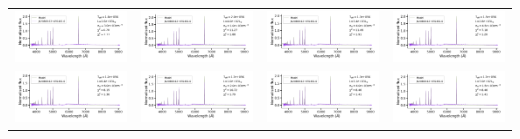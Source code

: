 \begin{table}
\begin{tabular}{l l l l }
    \includegraphics[width=0.24\linewidth, clip]{Figs/model_160000_36.79_3.48.pdf} & \includegraphics[width=0.24\linewidth, clip]{Figs/model_200000_36.19_3.00.pdf} & \includegraphics[width=0.24\linewidth, clip]{Figs/model_130000_37.12_3.60.pdf} & \includegraphics[width=0.24\linewidth, clip]{Figs/model_150000_37.03_3.65.pdf} \\
    \includegraphics[width=0.24\linewidth, clip]{Figs/model_120000_37.39_3.78.pdf} & \includegraphics[width=0.24\linewidth, clip]{Figs/model_170000_36.58_3.30.pdf} & \includegraphics[width=0.24\linewidth, clip]{Figs/model_130000_37.08_3.60.pdf} & \includegraphics[width=0.24\linewidth, clip]{Figs/model_170000_36.43_3.18.pdf} \\

\end{tabular}
\end{table}
